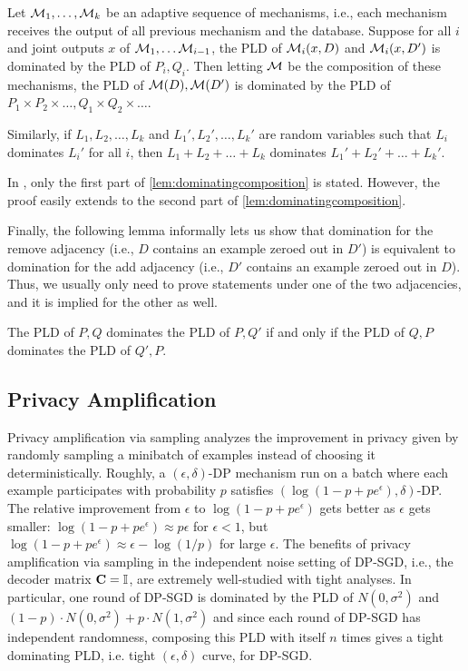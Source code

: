 \begin{lem}\label{lem:dominatingcomposition}
Let $\mathcal{M}_1, \ldots, \mathcal{M}_k$ be an adaptive sequence of mechanisms, i.e., each mechanism receives the output of all previous mechanism and the database. Suppose for all $i$ and joint outputs $x$ of $\mathcal{M}_1, \ldots \mathcal{M}_{i-1}$, the PLD of $\mathcal{M}_i(x, D)$ and $\mathcal{M}_i(x, D')$ is dominated by the PLD of $P_i, Q_i$. Then letting $\mathcal{M}$ be the composition of these mechanisms, the PLD of $\mathcal{M}(D), \mathcal{M}(D')$ is dominated by the PLD of $P_1 \times P_2 \times \ldots, Q_1 \times Q_2 \times \ldots$.

Similarly, if $L_1, L_2, \ldots, L_k$ and $L_1', L_2', \ldots, L_k'$ are random variables such that $L_i$ dominates $L_i'$ for all $i$, then $L_1 + L_2 + \ldots + L_k$ dominates $L_1' + L_2' + \ldots + L_k'$.
\end{lem}

In \cite{CharacteristicAccounting}, only the first part of \cref{lem:dominatingcomposition} is stated. However, the proof easily extends to the second part of \cref{lem:dominatingcomposition}.

Finally, the following lemma informally lets us show that domination for the remove adjacency (i.e., $D$ contains an example zeroed out in $D'$) is equivalent to domination for the add adjacency (i.e., $D'$ contains an example zeroed out in $D$). Thus, we usually only need to prove statements under one of the two adjacencies, and it is implied for the other as well.

\begin{lem}\label{lem:addvsremove}
The PLD of $P, Q$ dominates the PLD of $P, Q'$ if and only if the PLD of $Q, P$ dominates the PLD of $Q', P$.
\end{lem}

\subsection{Privacy Amplification}
Privacy amplification via sampling analyzes the improvement in privacy given by randomly sampling a minibatch of examples instead of choosing it deterministically. Roughly, a $(\epsilon, \delta)$-DP mechanism run on a batch where each example participates with probability $p$ satisfies $(\log(1 - p + p e^\epsilon), \delta)$-DP. The relative improvement from $\epsilon$ to $\log(1 - p + p e^\epsilon)$ gets better as $\epsilon$ gets smaller: $\log(1 - p + p e^\epsilon) \approx p\epsilon$ for $\epsilon < 1$, but $\log(1 - p + p e^\epsilon) \approx \epsilon - \log(1/p)$ for large $\epsilon$. 
The benefits of privacy amplification via sampling in the independent noise setting of DP-SGD, i.e., the decoder matrix $\mathbf{C}=\mathbb{I}$, are extremely well-studied \citep{song2013stochastic,BST14,abadi2016deep,mironov2019r,steinke2022composition,koskela2020computing} with tight analyses. In particular, one round of DP-SGD is dominated by the PLD of $N(0, \sigma^2)$ and $(1-p) \cdot N(0, \sigma^2) + p \cdot N(1, \sigma^2)$ and since each round of DP-SGD has independent randomness, composing this PLD with itself $n$ times gives a tight dominating PLD, i.e. tight $(\epsilon, \delta)$ curve, for DP-SGD.
